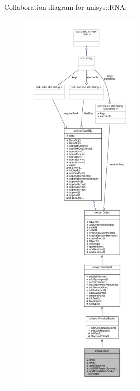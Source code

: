 Collaboration diagram for unisys\-:\-:R\-N\-A\-:
\nopagebreak
\begin{figure}[H]
\begin{center}
\leavevmode
\includegraphics[height=550pt]{classunisys_1_1RNA__coll__graph}
\end{center}
\end{figure}
